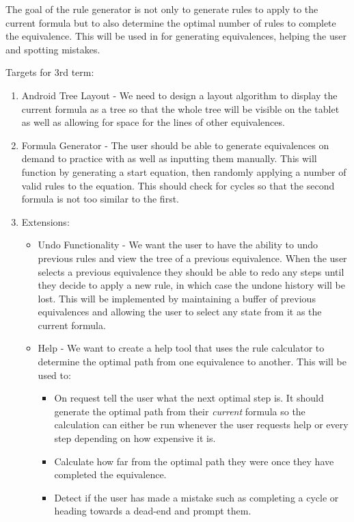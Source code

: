 \documentclass{report}
\begin{document}
The goal of the rule generator is not only to generate rules to apply to the current formula but to also determine the optimal number of rules to complete the equivalence. This will be used in for generating equivalences, helping the user and spotting mistakes.

Targets for 3rd term:

\begin{enumerate}
\item Android Tree Layout - We need to design a layout algorithm to display the current formula as a tree so that the whole tree will be visible on the tablet as well as allowing for space for the lines of other equivalences.
\item Formula Generator - The user should be able to generate equivalences on demand to practice with as well as inputting them manually. This will function by generating a start equation, then randomly applying a number of valid rules to the equation. This should check for cycles so that the second formula is not too similar to the first.
\item Extensions:

\begin{itemize}
\item Undo Functionality - We want the user to have the ability to undo previous rules and view the tree of a previous equivalence. When the user selects a previous equivalence they should be able to redo any steps until they decide to apply a new rule, in which case the undone history will be lost. This will be implemented by maintaining a buffer of previous equivalences and allowing the user to select any state from it as the current formula.
\item Help - We want to create a help tool that uses the rule calculator to determine the optimal path from one equivalence to another. This will be used to:

\begin{itemize}
\item On request tell the user what the next optimal step is. It should generate the optimal path from their \textit{current} formula so the calculation can either be run whenever the user requests help or every step depending on how expensive it is.
\item Calculate how far from the optimal path they were once they have completed the equivalence.
\item Detect if the user has made a mistake such as completing a cycle or heading towards a dead-end and prompt them.
\end{itemize}
  

\end{itemize}
\end{enumerate}
\end{document}
